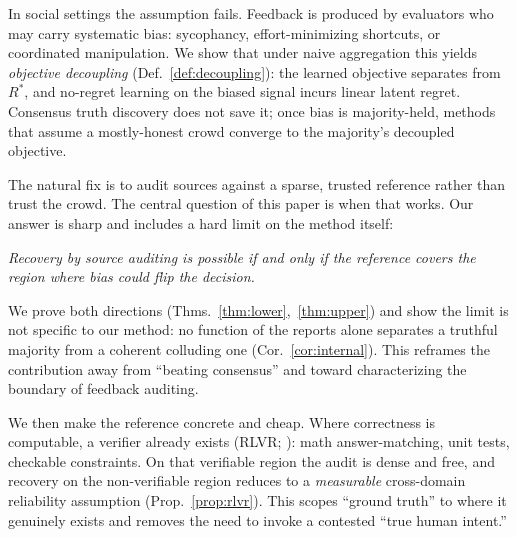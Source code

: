 \documentclass[11pt]{article}
\theoremstyle{definition}\newtheorem{definition}{Definition}
\theoremstyle{definition}\newtheorem{assumption}{Assumption}
\newcommand{\Rstar}{R^{\ast}}\newcommand{\astar}{a^{\ast}}
\begin{document}
In social settings the assumption fails. Feedback is produced by evaluators who may carry systematic
bias: sycophancy, effort-minimizing shortcuts, or coordinated manipulation. We show that under naive
aggregation this yields \emph{objective decoupling} (Def.~\ref{def:decoupling}): the learned
objective separates from $\Rstar$, and no-regret learning on the biased signal incurs linear latent
regret. Consensus truth discovery does not save it; once bias is majority-held, methods that assume
a mostly-honest crowd converge to the majority's decoupled objective.

The natural fix is to audit sources against a sparse, trusted reference rather than trust the crowd.
The central question of this paper is when that works. Our answer is sharp and includes a hard limit
on the method itself:

\smallskip
\noindent\emph{Recovery by source auditing is possible if and only if the reference covers the
region where bias could flip the decision.}
\smallskip

We prove both directions (Thms.~\ref{thm:lower},~\ref{thm:upper}) and show the limit is not specific
to our method: no function of the reports alone separates a truthful majority from a coherent
colluding one (Cor.~\ref{cor:internal}). This reframes the contribution away from ``beating
consensus'' and toward characterizing the boundary of feedback auditing.

We then make the reference concrete and cheap. Where correctness is computable, a verifier already
exists (RLVR; \citealp{lambert2024tulu,guo2025deepseekr1}): math answer-matching, unit tests,
checkable constraints. On that verifiable region the audit is dense and free, and recovery on the
non-verifiable region reduces to a \emph{measurable} cross-domain reliability assumption
(Prop.~\ref{prop:rlvr}). This scopes ``ground truth'' to where it genuinely exists and removes the
need to invoke a contested ``true human intent.''
\end{document}

